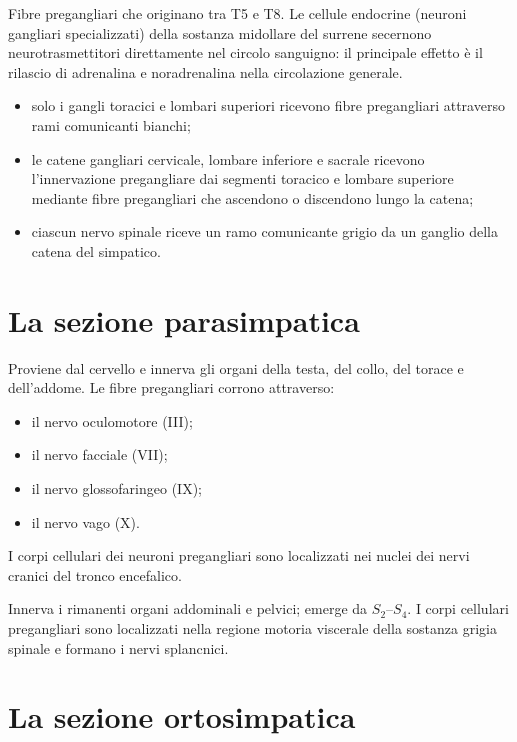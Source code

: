 Fibre pregangliari che originano tra T5 e T8. Le cellule endocrine
(neuroni gangliari specializzati) della sostanza midollare del surrene
secernono neurotrasmettitori direttamente nel circolo sanguigno: il
principale effetto è il rilascio di adrenalina e noradrenalina nella
circolazione generale.

\begin{itemize}
  \item solo i gangli toracici e lombari superiori ricevono fibre
    pregangliari attraverso rami comunicanti bianchi;
  \item le catene gangliari cervicale, lombare inferiore e sacrale
    ricevono l'innervazione pregangliare dai segmenti toracico e lombare
    superiore mediante fibre pregangliari che ascendono o discendono
    lungo la catena;
  \item ciascun nervo spinale riceve un ramo comunicante grigio da un
    ganglio della catena del simpatico.
\end{itemize}

\section{La sezione parasimpatica}

Proviene dal cervello e innerva gli organi della testa, del collo, del
torace e dell'addome. Le fibre pregangliari corrono attraverso:
\begin{itemize}
  \item il nervo oculomotore (III);
  \item il nervo facciale (VII);
  \item il nervo glossofaringeo (IX);
  \item il nervo vago (X).
\end{itemize}
I corpi cellulari dei neuroni pregangliari sono localizzati nei nuclei dei
nervi cranici del tronco encefalico.

Innerva i rimanenti organi addominali e pelvici; emerge da $S_2$--$S_4$. I
corpi cellulari pregangliari sono localizzati nella regione motoria
viscerale della sostanza grigia spinale e formano i nervi splancnici.

\section{La sezione ortosimpatica}

